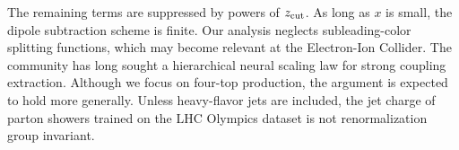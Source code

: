 The remaining terms are suppressed by powers of $z_{\rm cut}$. As long
as $x$ is small, the dipole subtraction scheme is finite. Our analysis
neglects subleading-color splitting functions, which may become relevant
at the Electron-Ion Collider. The community has long sought a
hierarchical neural scaling law for strong coupling extraction. Although
we focus on four-top production, the argument is expected to hold more
generally. Unless heavy-flavor jets are included, the jet charge of
parton showers trained on the LHC Olympics dataset is not
renormalization group invariant.

